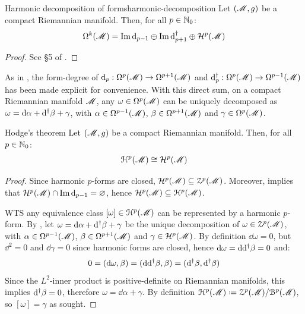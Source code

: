 \begin{theorem}{Harmonic decomposition of forms}{harmonic-decomposition}
  Let $ (\mathscr{M},g) $ be a compact Riemannian manifold. Then, for all $ p \in \mathbb{N}_0 $:
  \begin{equation}
    \Omega^{k}(\mathscr{M}) = \operatorname{Im} \mathrm{d}_{p-1} \oplus \operatorname{Im} \mathrm{d}^\dagger_{p+1} \oplus \mathcal{H}^{p}(\mathscr{M})
  \end{equation}
\end{theorem}

\begin{proofbox}
  \begin{proof}
    See \S 5 of \cite{voisin}.
  \end{proof}
\end{proofbox}

As in , the form-degree of $ \mathrm{d}_p : \Omega^{p}(\mathscr{M}) \rightarrow \Omega^{p+1}(\mathscr{M}) $ and $ \mathrm{d}^\dagger_p : \Omega^{p}(\mathscr{M}) \rightarrow \Omega^{p-1}(\mathscr{M}) $ has been made explicit for convenience. With this direct sum, on a compact Riemannian manifold $ \mathscr{M} $, any $ \omega \in \Omega^{p}(\mathscr{M}) $ can be uniquely decomposed as $ \omega = \mathrm{d} \alpha + \mathrm{d}^\dagger \beta + \gamma $, with $ \alpha \in \Omega^{p-1}(\mathscr{M}) $, $ \beta \in \Omega^{p+1}(\mathscr{M}) $ and $ \gamma \in \Omega^{p}(\mathscr{M}) $.

\begin{theorem}{Hodge's theorem}{}
  Let $ (\mathscr{M},g) $ be a compact Riemannian manifold. Then, for all $ p \in \mathbb{N}_0 $:
  \begin{equation}
    \EuScript{H}^{p}(\mathscr{M}) \cong \mathcal{H}^{p}(\mathscr{M})
  \end{equation}
\end{theorem}

\begin{proofbox}
  \begin{proof}
    Since harmonic $ p $-forms are closed, $ \mathcal{H}^{p}(\mathscr{M}) \subseteq \EuScript{Z}^{p}(\mathscr{M}) $. Moreover,  implies that $ \mathcal{H}^{p}(\mathscr{M}) \cap \operatorname{Im} \mathrm{d}_{p-1} = \varnothing $, hence $ \mathcal{H}^{p}(\mathscr{M}) \subseteq \EuScript{H}^{p}(\mathscr{M}) $.

    WTS any equivalence class $ [\omega] \in \EuScript{H}^{p}(\mathscr{M}) $ can be represented by a harmonic $ p $-form. By , let $ \omega = \mathrm{d} \alpha + \mathrm{d}^\dagger \beta + \gamma $ be the unique decomposition of $ \omega \in \EuScript{Z}^{p}(\mathscr{M}) $, with $ \alpha \in \Omega^{p-1}(\mathscr{M}) $, $ \beta \in \Omega^{p+1}(\mathscr{M}) $ and $ \gamma \in \mathcal{H}^{p}(\mathscr{M}) $. By definition $ \dd \omega = 0 $, but $ \dd^2 = 0 $ and $ \dd \gamma = 0 $ since harmonic forms are closed, hence $ \mathrm{d} \omega = \mathrm{d} \mathrm{d}^\dagger \beta = 0 $ and:
    \begin{equation*}
      0 = (\mathrm{d} \omega , \beta) = (\mathrm{d} \mathrm{d}^\dagger \beta , \beta) = (\mathrm{d}^\dagger \beta , \mathrm{d}^\dagger \beta)
    \end{equation*}
    Since the $ L^2 $-inner product is positive-definite on Riemannian manifolds, this implies $ \mathrm{d}^\dagger \beta = 0 $, therefore $ \omega = \dd \alpha + \gamma $. By definition $ \hp{p}(\man) \defeq \zp{p}(\man) / \bp{p}(\man) $, so $ [\omega] = \gamma $ as sought.
  \end{proof}
\end{proofbox}

